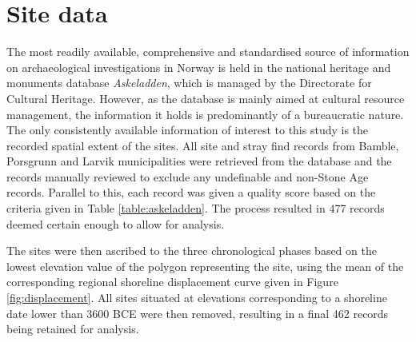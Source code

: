 \documentclass[12pt, a4paper]{article}
\begin{document}
\section{Site data}
The most readily available, comprehensive and standardised source of information on archaeological investigations in Norway is held in the national heritage and monuments database \textit{Askeladden}, which is managed by the Directorate for Cultural Heritage. However, as the database is mainly aimed at cultural resource management, the information it holds is predominantly of a bureaucratic nature. The only consistently available information of interest to this study is the recorded spatial extent of the sites. All site and stray find records from Bamble, Porsgrunn and Larvik municipalities were retrieved from the database and the records manually reviewed to exclude any undefinable and non-Stone Age records. Parallel to this, each record was given a quality score based on the criteria given in Table \ref{table:askeladden}. The process resulted in 477 records deemed certain enough to allow for analysis.\par
The sites were then ascribed to the three chronological phases based on the lowest elevation value of the polygon representing the site, using the mean of the corresponding regional shoreline displacement curve given in Figure \ref{fig:displacement}. All sites situated at elevations corresponding to a shoreline date lower than 3600 BCE were then removed, resulting in a final 462 records being retained for analysis. \par  
\end{document}
